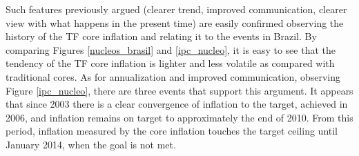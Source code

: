 \documentclass[10pt]{article}
\begin{document}

Such features previously argued (clearer trend, improved communication, clearer view with what happens in the present time) are easily confirmed observing the history of the TF core inflation and relating it to the events in Brazil. By comparing Figures  \ref{nucleos_brasil} and \ref{ipc_nucleo},  it  is easy to see that the tendency of the TF core inflation is lighter and less volatile as compared with traditional cores. As for annualization and improved communication, observing Figure \ref{ipc_nucleo}, there are three events that support this argument. It appears that since 2003 there is a clear convergence of inflation to the target, achieved in 2006, and inflation remains on target to approximately the end of 2010. From this period, inflation measured by the core inflation touches the target ceiling until January 2014, when the goal is not met.

\end{document}
